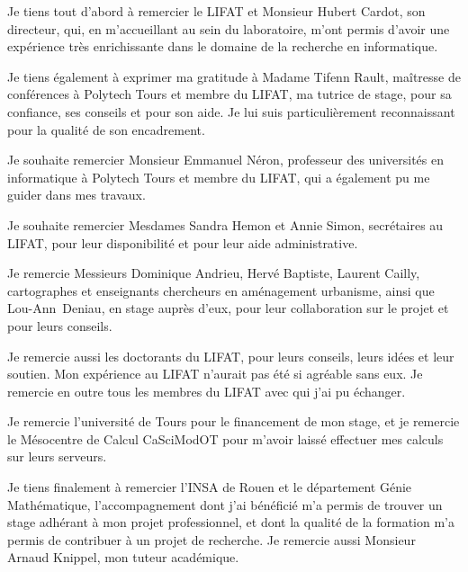 Je tiens tout d'abord à remercier le LIFAT et Monsieur Hubert Cardot, son directeur, qui, en m'accueillant au sein du laboratoire, m'ont permis d'avoir une expérience très enrichissante dans le domaine de la recherche en informatique. 

Je tiens également à exprimer ma gratitude à Madame Tifenn Rault, maîtresse de conférences à Polytech Tours et membre du LIFAT, ma tutrice de stage, pour sa confiance, ses conseils et pour son aide. Je lui suis particulièrement reconnaissant pour la qualité de son encadrement.

Je souhaite remercier Monsieur Emmanuel Néron, professeur des universités en informatique à Polytech Tours et membre du LIFAT, qui a également pu me guider dans mes travaux.

Je souhaite remercier Mesdames Sandra Hemon et Annie Simon, secrétaires au LIFAT, pour leur disponibilité et pour leur aide administrative.

Je remercie Messieurs Dominique Andrieu, Hervé Baptiste, Laurent Cailly, cartographes et enseignants chercheurs en aménagement urbanisme, ainsi que Lou-Ann~Deniau, en stage auprès d'eux, pour leur collaboration sur le projet et pour leurs conseils.

Je remercie aussi les doctorants du LIFAT, pour leurs conseils, leurs idées et leur soutien. Mon expérience au LIFAT n'aurait pas été si agréable sans eux. Je remercie en outre tous les membres du LIFAT avec qui j'ai pu échanger. 

Je remercie l'université de Tours pour le financement de mon stage, et je remercie le Mésocentre de Calcul CaSciModOT pour m'avoir laissé effectuer mes calculs sur leurs serveurs.

Je tiens finalement à remercier l'INSA de Rouen et le département Génie Mathématique, l'accompagnement dont j'ai bénéficié m'a permis de trouver un stage adhérant à mon projet professionnel, et dont la qualité de la formation m'a permis de contribuer à un projet de recherche. Je remercie aussi Monsieur Arnaud Knippel, mon tuteur académique.

